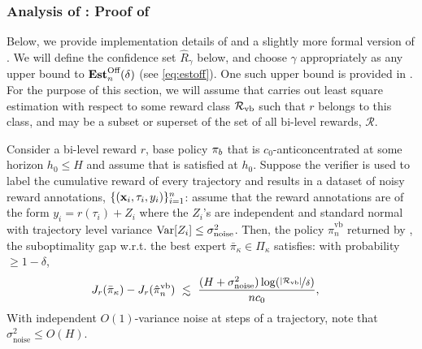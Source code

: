 \subsubsection{Analysis of : Proof of }

Below, we provide implementation details of  and a slightly more formal version of . We will define the confidence set $\hat{R}_\gamma$ below, and choose $\gamma$ appropriately as any upper bound to $\textbf{Est}^{\text{Off}}_n(\delta)$ (see \cref{eq:estoff}). One such upper bound is provided in . For the purpose of this section, we will assume that  carries out least square estimation with respect to some reward class ${\mathcal{R}}_{\text{vb}}$ such that $r$ belongs to this class, and may be a subset or superset of the set of all bi-level rewards, $\mathcal{R}$.

\begin{theorem}
Consider a bi-level reward $r$,  base policy $\pi_b$ that is $c_0$-anticoncentrated at some horizon $h_0 \leq H$ and assume that  is satisfied at $h_0$. Suppose the verifier is used to label the cumulative reward of every trajectory and results in a dataset of noisy reward annotations, $\{ (\mathbf{x}_i,\tau_i,y_i) \}_{i=1}^n$: assume that the reward annotations are of the form $y_i = r(\tau_i) + Z_i$ where the $Z_i$'s are independent and standard normal with trajectory level variance $\mathrm{Var}[Z_i] \le \sigma_{\text{noise}}^2$. Then, the policy $\hat{\pi}_n^{\mathrm{vb}}$ returned by ,  
the suboptimality gap w.r.t. the best expert $\bar{\pi}_\kappa \in \Pi_\kappa$ satisfies: with probability $\ge 1 - \delta$,
\begin{align*}   
    &J_r(\bar{\pi}_\kappa) - J_r(\hat{\pi}_{n}^\mathrm{vb}) \; \lsim \;  \frac{(H + \sigma_{\text{noise}}^2) \log(\nicefrac{|\gR_{\text{vb}}|}{\delta})}{n c_0},
\end{align*}  
With independent $O(1)$-variance noise at steps of a trajectory, note that $\sigma_{\text{noise}}^2 \le O(H)$.
\end{theorem}


